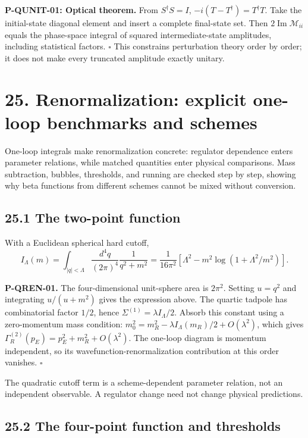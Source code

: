 \documentclass[
  11pt,
  oneside]{book}
\begin{document}
\textbf{P-QUNIT-01: Optical theorem.} From \(S^\dagger S=I\),
\(-i(T-T^\dagger)=T^\dagger T\). Take the initial-state diagonal element
and insert a complete final-state set. Then
\(2\operatorname{Im}\mathcal M_{ii}\) equals the phase-space integral of
squared intermediate-state amplitudes, including statistical factors.
\(\square\) This constrains perturbation theory order by order; it does
not make every truncated amplitude exactly unitary.

\chapter{25. Renormalization: explicit one-loop benchmarks and
schemes}\label{ch-25}

One-loop integrals make renormalization concrete: regulator dependence
enters parameter relations, while matched quantities enter physical
comparisons. Mass subtraction, bubbles, thresholds, and running are
checked step by step, showing why beta functions from different schemes
cannot be mixed without conversion.

\section{25.1 The two-point function}

With a Euclidean spherical hard cutoff, \[
I_\Lambda(m)=\int_{|q|<\Lambda}\frac{d^4q}{(2\pi)^4}
\frac1{q^2+m^2}
=\frac1{16\pi^2}\left[\Lambda^2-m^2\log(1+\Lambda^2/m^2)\right].
\] \label{p-qren-01}{}

\textbf{P-QREN-01.} The four-dimensional unit-sphere area is \(2\pi^2\).
Setting \(u=q^2\) and integrating \(u/(u+m^2)\) gives the expression
above. The quartic tadpole has combinatorial factor \(1/2\), hence
\(\Sigma^{(1)}=\lambda I_\Lambda/2\). Absorb this constant using a
zero-momentum mass condition:
\(m_0^2=m_R^2-\lambda I_\Lambda(m_R)/2+O(\lambda^2)\), which gives
\(\Gamma_R^{(2)}(p_E)=p_E^2+m_R^2+O(\lambda^2)\). The one-loop diagram
is momentum independent, so its wavefunction-renormalization
contribution at this order vanishes. \(\square\)

The quadratic cutoff term is a scheme-dependent parameter relation, not
an independent observable. A regulator change need not change physical
predictions.

\section{25.2 The four-point function and thresholds}
\end{document}
